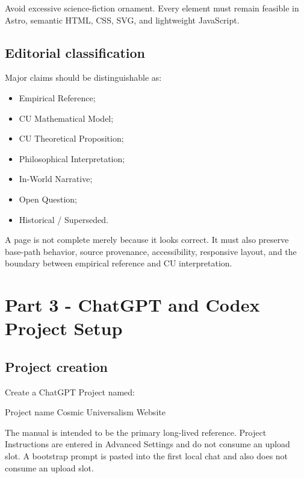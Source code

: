\documentclass[11pt,letterpaper]{article}
\begin{document}
Avoid excessive science-fiction ornament. Every element must remain feasible in
Astro, semantic HTML, CSS, SVG, and lightweight JavaScript.

\subsection{Editorial classification}

Major claims should be distinguishable as:

\begin{itemize}
    \item Empirical Reference;
    \item CU Mathematical Model;
    \item CU Theoretical Proposition;
    \item Philosophical Interpretation;
    \item In-World Narrative;
    \item Open Question;
    \item Historical / Superseded.
\end{itemize}

\begin{checkpointbox}
A page is not complete merely because it looks correct. It must also preserve
base-path behavior, source provenance, accessibility, responsive layout, and
the boundary between empirical reference and CU interpretation.
\end{checkpointbox}

\section{Part 3 - ChatGPT and Codex Project Setup}

\subsection{Project creation}

Create a ChatGPT Project named:

\begin{codebox}{Project name}
Cosmic Universalism Website
\end{codebox}

The manual is intended to be the primary long-lived reference. Project
Instructions are entered in Advanced Settings and do not consume an upload
slot. A bootstrap prompt is pasted into the first local chat and also does not
consume an upload slot.
\end{document}

